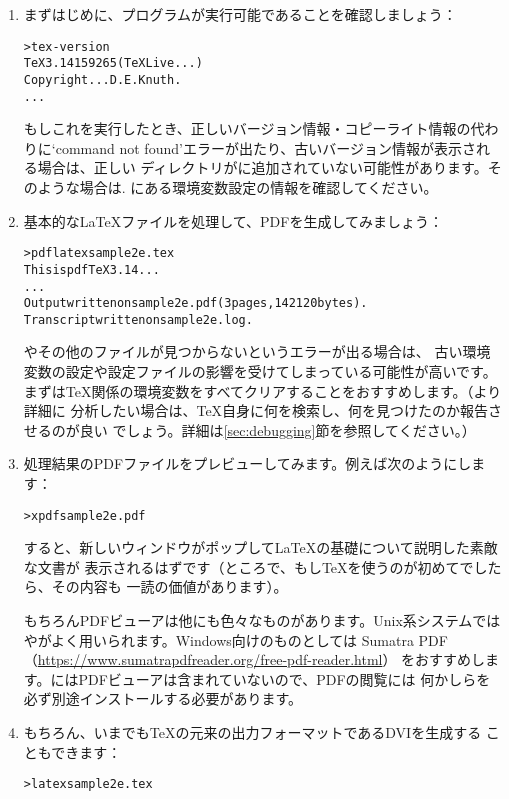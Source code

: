 \documentclass[uplatex,dvipdfmx,12pt,tombow]{jsarticle}
\begin{document}
\begin{enumerate}
\item まずはじめに、プログラムが実行可能であることを確認しましょう：
%
\begin{alltt}
> tex -version
TeX 3.14159265 (TeX Live ...)
Copyright ... D.E. Knuth.
...
\end{alltt}
%
もしこれを実行したとき、正しいバージョン情報・コピーライト情報の代わりに`command
not found'エラーが出たり、古いバージョン情報が表示される場合は、正しい%
ディレクトリがに追加されていない可能性があります。そのような場合は\p.%
\pageref{sec:env}にある環境変数設定の情報を確認してください。

\item 基本的な\LaTeX ファイルを処理して、PDFを生成してみましょう：
%
\begin{alltt}
> pdflatex sample2e.tex
This is pdfTeX 3.14...
...
Output written on sample2e.pdf (3 pages, 142120 bytes).
Transcript written on sample2e.log.
\end{alltt}
%
やその他のファイルが見つからないというエラーが出る場合は、
古い環境変数の設定や設定ファイルの影響を受けてしまっている可能性が高いです。
まずは\TeX 関係の環境変数をすべてクリアすることをおすすめします。（より詳細に
分析したい場合は、\TeX 自身に何を検索し、何を見つけたのか報告させるのが良い
でしょう。詳細は\ref{sec:debugging}節を参照してください。）

\item 処理結果のPDFファイルをプレビューしてみます。例えば次のようにします：
%
\begin{alltt}
> xpdf sample2e.pdf
\end{alltt}
%
すると、新しいウィンドウがポップして\LaTeX の基礎について説明した素敵な文書が
表示されるはずです（ところで、もし\TeX を使うのが初めてでしたら、その内容も
一読の価値があります）。

もちろんPDFビューアは他にも色々なものがあります。Unix系システムでは
やがよく用いられます。Windows向けのものとしては
Sumatra PDF（\url{https://www.sumatrapdfreader.org/free-pdf-reader.html}）
をおすすめします。\TL にはPDFビューアは含まれていないので、PDFの閲覧には
何かしらを必ず別途インストールする必要があります。

\item もちろん、いまでも\TeX の元来の出力フォーマットであるDVIを生成する
こともできます：
%
\begin{alltt}
> latex sample2e.tex
\end{alltt}


\end{enumerate}
\end{document}
